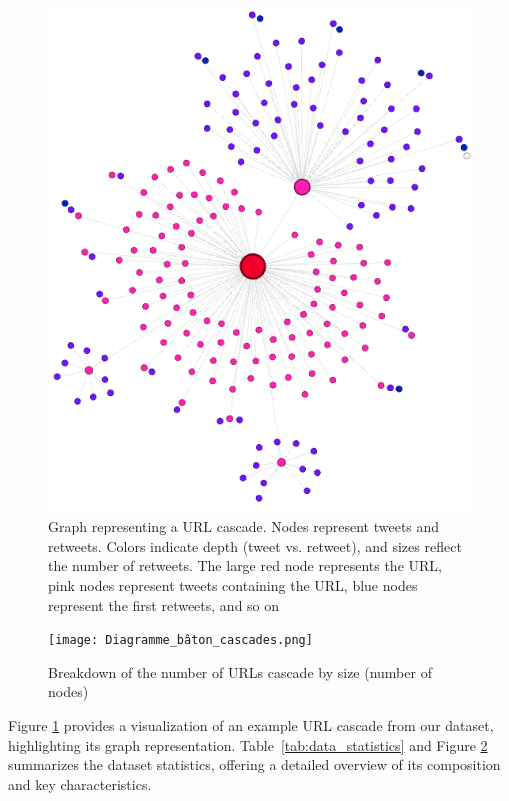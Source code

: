 \documentclass[sigconf,nonacm]{acmart}
\begin{document}
\begin{figure}
    \centering
    \includegraphics[scale=0.3]{graph_528_label_0_better_representation.png}
    \caption{Graph representing a URL cascade. Nodes represent tweets and retweets. Colors indicate depth (tweet vs. retweet), and sizes reflect the number of retweets. The large red node represents the URL, pink nodes represent tweets containing the URL, blue nodes represent the first retweets, and so on}
    \label{fig:url_cascade}
\end{figure}

\begin{figure}
    \centering
    \texttt{[image: Diagramme\_bâton\_cascades.png]}
    \caption{Breakdown of the number of URLs cascade by size (number of nodes)}
    \label{fig:graph_repartition}
\end{figure}



Figure \ref{fig:url_cascade} provides a visualization of an example URL cascade from our dataset, highlighting its graph representation. Table~\ref{tab:data_statistics} and Figure \ref{fig:graph_repartition} summarizes the dataset statistics, offering a detailed overview of its composition and key characteristics.
\end{document}
